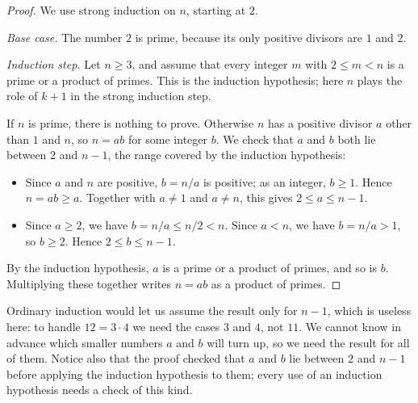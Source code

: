 \begin{proof}
We use strong induction on $n$, starting at $2$.

\emph{Base case.} The number $2$ is prime, because its only positive divisors are $1$ and $2$.

\emph{Induction step.} Let $n\ge3$, and assume that every integer $m$ with $2\le m<n$ is a prime or a product of primes. This is the induction hypothesis; here $n$ plays the role of $k+1$ in the strong induction step.

If $n$ is prime, there is nothing to prove. Otherwise $n$ has a positive divisor $a$ other than $1$ and $n$, so $n=ab$ for some integer $b$. We check that $a$ and $b$ both lie between $2$ and $n-1$, the range covered by the induction hypothesis:
\begin{itemize}
\item Since $a$ and $n$ are positive, $b=n/a$ is positive; as an integer, $b\ge1$. Hence $n=ab\ge a$. Together with $a\ne1$ and $a\ne n$, this gives $2\le a\le n-1$.
\item Since $a\ge2$, we have $b=n/a\le n/2<n$. Since $a<n$, we have $b=n/a>1$, so $b\ge2$. Hence $2\le b\le n-1$.
\end{itemize}
By the induction hypothesis, $a$ is a prime or a product of primes, and so is $b$. Multiplying these together writes $n=ab$ as a product of primes.
\end{proof}

Ordinary induction would let us assume the result only for $n-1$, which is useless here: to handle $12=3\cdot4$ we need the cases $3$ and $4$, not $11$. We cannot know in advance which smaller numbers $a$ and $b$ will turn up, so we need the result for all of them. Notice also that the proof checked that $a$ and $b$ lie between $2$ and $n-1$ before applying the induction hypothesis to them; every use of an induction hypothesis needs a check of this kind.
